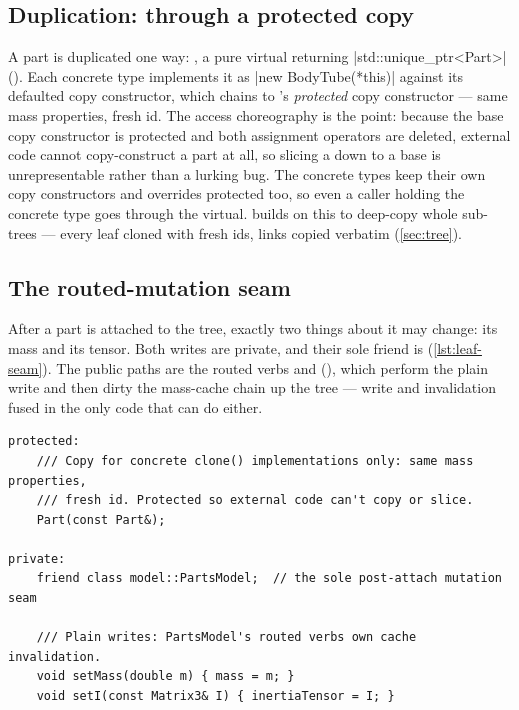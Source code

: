 \subsection[Duplication: clone() through a protected copy]{Duplication:  through a protected copy}\label{sec:leaf-clone}

A part is duplicated one way: , a pure virtual returning
\cppinline|std::unique_ptr<Part>| (). Each concrete type implements
it as \cppinline|new BodyTube(*this)| against its defaulted copy constructor, which chains to
's \emph{protected} copy constructor --- same mass properties, fresh id. The access
choreography is the point: because the base copy constructor is protected and both assignment
operators are deleted, external code cannot copy-construct a part at all, so slicing a
 down to a base  is unrepresentable rather than a lurking bug. The
concrete types keep their own copy constructors and  overrides protected too, so
even a caller holding the concrete type goes through the virtual.  builds on
this to deep-copy whole sub-trees --- every leaf cloned with fresh ids, links copied verbatim
(\cref{sec:tree}).

\subsection{The routed-mutation seam}\label{sec:leaf-seam}

After a part is attached to the tree, exactly two things about it may change: its mass and its
tensor. Both writes are private, and their sole friend is 
(\cref{lst:leaf-seam}). The public paths are the routed verbs
 and  (),
which perform the plain write and then dirty the mass-cache chain up the tree --- write and
invalidation fused in the only code that can do either.

\begin{listing}[htbp]
\begin{verbatim}
protected:
    /// Copy for concrete clone() implementations only: same mass properties,
    /// fresh id. Protected so external code can't copy or slice.
    Part(const Part&);

private:
    friend class model::PartsModel;  // the sole post-attach mutation seam

    /// Plain writes: PartsModel's routed verbs own cache invalidation.
    void setMass(double m) { mass = m; }
    void setI(const Matrix3& I) { inertiaTensor = I; }
\end{verbatim}
\caption{The copy and mutation seams of the leaf (--137).}
\label{lst:leaf-seam}
\end{listing}

